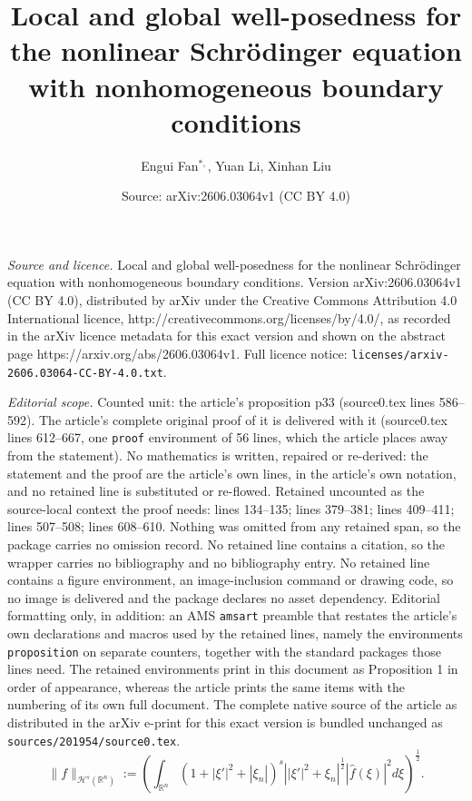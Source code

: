 \documentclass[10pt,a4paper]{amsart}
\title{Local and global well-posedness for the nonlinear Schr\"{o}dinger equation with nonhomogeneous boundary conditions}
\author{Engui Fan$^{*, }$, Yuan Li, Xinhan Liu}
\date{Source: arXiv:2606.03064v1 (CC BY 4.0)}
\begin{document}
\maketitle

\noindent\emph{Source and licence.} Local and global well-posedness for the nonlinear Schr\"{o}dinger equation with nonhomogeneous boundary conditions. Version arXiv:2606.03064v1 (CC BY 4.0), distributed by arXiv under the Creative Commons Attribution 4.0 International licence, http://creativecommons.org/licenses/by/4.0/, as recorded in the arXiv licence metadata for this exact version and shown on the abstract page https://arxiv.org/abs/2606.03064v1. Full licence notice: \texttt{licenses/arxiv-2606.03064-CC-BY-4.0.txt}.\par\smallskip

\noindent\textit{Editorial scope.} Counted unit: the article's proposition p33 (source0.tex lines 586--592). The article's complete original proof of it is delivered with it (source0.tex lines 612--667, one \texttt{proof} environment of 56 lines, which the article places away from the statement). No mathematics is written, repaired or re-derived: the statement and the proof are the article's own lines, in the article's own notation, and no retained line is substituted or re-flowed.  Retained uncounted as the source-local context the proof needs: lines 134--135; lines 379--381; lines 409--411; lines 507--508; lines 608--610.  Nothing was omitted from any retained span, so the package carries no omission record.  No retained line contains a citation, so the wrapper carries no bibliography and no bibliography entry.  No retained line contains a figure environment, an image-inclusion command or drawing code, so no image is delivered and the package declares no asset dependency.  Editorial formatting only, in addition: an AMS \texttt{amsart} preamble that restates the article's own declarations and macros used by the retained lines, namely the environments \texttt{proposition} on separate counters, together with the standard packages those lines need.  The retained environments print in this document as Proposition 1 in order of appearance, whereas the article prints the same items with the numbering of its own full document.  The complete native source of the article as distributed in the arXiv e-print for this exact version is bundled unchanged as \texttt{sources/201954/source0.tex}.
\begin{equation}\label{blackmail}			\|f\|_{\mathcal{H}^{s}(\mathbb{R}^{n})}:=\left(\int_{\mathbb{R}^{n}}\left(1+|\xi'|^2+|\xi_{n}|\right)^{s}\left||\xi'|^{2}+\xi_{n}\right|^{\frac{1}{2}}|\widehat{f}(\xi)|^{2}d\xi\right)^{\frac{1}{2}}.
\end{equation}
\end{document}
